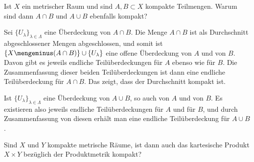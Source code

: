 \begin{frage}
  Ist $X$ ein metrischer Raum und sind $A,B \subset X$ kompakte Teilmengen. 
  Warum sind dann $A\cap B$ und $A\cup B$ ebenfalls kompakt? 
\end{frage}

\begin{antwort}
  Sei $\{ U_\lambda \}_{\lambda\in \Lambda}$ eine Überdeckung 
  von $A\cap B$. Die Menge $A\cap B$ ist als Durchschnitt 
  abgeschlossener Mengen abgeschlossen, und somit ist 
  $\{ X\mengeminus ( A\cap B ) \} \cup \{ U_\lambda \}$ eine 
  offene Überdeckung von $A$ und von $B$. Davon 
  gibt es jeweils endliche Teilüberdeckungen 
  für $A$ ebenso wie  für $B$. 
  Die Zusammenfassung dieser beiden Teilüberdeckungen ist 
  dann eine endliche Teilüberdeckung für $A\cap B$. Das zeigt, dass 
  der Durchschnitt kompakt ist.

   Ist $\{ U_\lambda \}_{\lambda\in \Lambda}$ eine 
  Überdeckung von $A\cup B$, so auch von $A$ und von $B$. Es existieren 
  also jeweils endliche Teilüberdeckungen für $A$ und für $B$, und durch 
  Zusammenfassung von diesen erhält man eine endliche Teilüberdeckung 
  für $A\cup B$.
  \AntEnd
\end{antwort}

\begin{frage}\label{q:119}\heavy
  Sind $X$ und $Y$ kompakte metrische Räume, ist dann auch das kartesische 
  Produkt $X\times Y$ bezüglich der Produktmetrik kompakt?
\end{frage}

